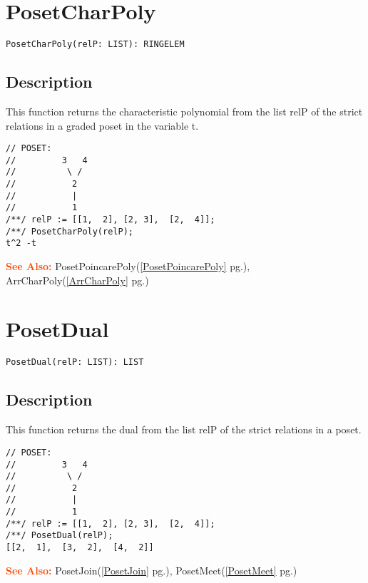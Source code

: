 \documentclass[a4paper]{mybook}
\newenvironment{command}{}{} %
\newcommand\SeeAlso{\par\textcolor{OrangeRed}{\textbf{\large See Also: }}}
\begin{document}
\section{PosetCharPoly}
\label{PosetCharPoly}
\begin{command} %


\begin{Verbatim}[label=syntax, rulecolor=\color{MidnightBlue},
frame=single]
PosetCharPoly(relP: LIST): RINGELEM
\end{Verbatim}


\subsection*{Description}

This function returns the characteristic polynomial from the list relP
of the strict relations in a graded poset in the variable t.
\begin{Verbatim}[label=example, rulecolor=\color{PineGreen}, frame=single]
// POSET:
//         3   4
//          \ /
//           2
//           |
//           1
/**/ relP := [[1,  2], [2, 3],  [2,  4]];
/**/ PosetCharPoly(relP);
t^2 -t
\end{Verbatim}


\SeeAlso %
  PosetPoincarePoly(\ref{PosetPoincarePoly} pg.\pageref{PosetPoincarePoly}), 
    ArrCharPoly(\ref{ArrCharPoly} pg.\pageref{ArrCharPoly})
\end{command} %

\section{PosetDual}
\label{PosetDual}
\begin{command} %


\begin{Verbatim}[label=syntax, rulecolor=\color{MidnightBlue},
frame=single]
PosetDual(relP: LIST): LIST
\end{Verbatim}


\subsection*{Description}

This function returns the dual from the list relP of the strict relations in a poset.
\begin{Verbatim}[label=example, rulecolor=\color{PineGreen}, frame=single]
// POSET:
//         3   4
//          \ /
//           2
//           |
//           1
/**/ relP := [[1,  2], [2, 3],  [2,  4]];
/**/ PosetDual(relP);
[[2,  1],  [3,  2],  [4,  2]]
\end{Verbatim}


\SeeAlso %
  PosetJoin(\ref{PosetJoin} pg.\pageref{PosetJoin}), 
    PosetMeet(\ref{PosetMeet} pg.\pageref{PosetMeet})
\end{command} %
\end{document}
